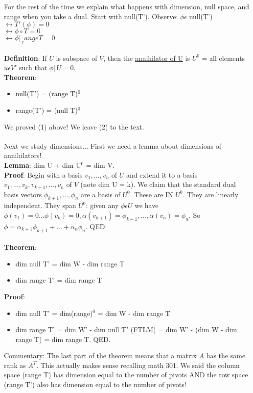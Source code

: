 \documentclass{article}
\begin{document}
For the rest of the time we explain what happens with dimension, null space, and range when you take a dual. Start with null(T'). Observe: $\phi \epsilon$ null(T') $\leftrightarrow T'(\phi)= 0$\\
$\leftrightarrow \phi \circ T = 0$\\
$\leftrightarrow \phi \lceil _ range T = 0$\\\\
\textbf{Definition}: If $U$ is subspace of $V$, then the \underline{annihilator of U} is $U^0$ = all elements $u \epsilon V'$ such that $\phi \lceil U = 0$.\\
\textbf{Theorem}: \begin{itemize}
    \item null(T') = (range T)$^0$
    \item range(T') = (null T)$^0$
\end{itemize}
We proved (1) above! We leave (2) to the text. \\\\
Next we study dimensions... First we need a lemma about dimensions of annihilators! \\
\textbf{Lemma}: dim U + dim U$^0$ = dim V. \\
\textbf{Proof}: Begin with a basis $v_1,..., v_n$ of $U$ and extend it to a basis $v_1,...,v_k,v_{k+1}, ..., v_n$ of $V$ (note dim U = k). We claim that the standard dual basis vectors $\phi_{k+1},..., \phi_n$ are a basis of $U^0$. These are IN $U^0$. They are linearly independent. They span $U^0$: given any $\phi \epsilon U$ we have $\phi(v_1) = 0... \phi(v_k) = 0, \alpha(v_{k+1}) = \phi_{k+1},..., \alpha(v_n) = \phi_n$. So $\phi = \alpha_{k+1}\phi_{k+1}+...+\alpha_n \phi_n$. QED. \\\\
\textbf{Theorem}: \begin{itemize}
    \item dim null T' = dim W - dim range T 
    \item dim range T' = dim range T 
\end{itemize}
\textbf{Proof}: \begin{itemize}
    \item dim null T' = dim(range)$^0$ = dim W - dim range T
    \item dim range T' = dim W' - dim null T' (FTLM) = dim W' - (dim W - dim range T) = dim range T. QED. 
\end{itemize}
Commentary: The last part of the theorem means that a matrix $A$ has the same rank as $A^T$. This actually makes sense recalling math 301. We said the column space (range T) has dimension equal to the number of pivots AND the row space (range T') also has dimension equal to the number of pivots! 
\end{document}
